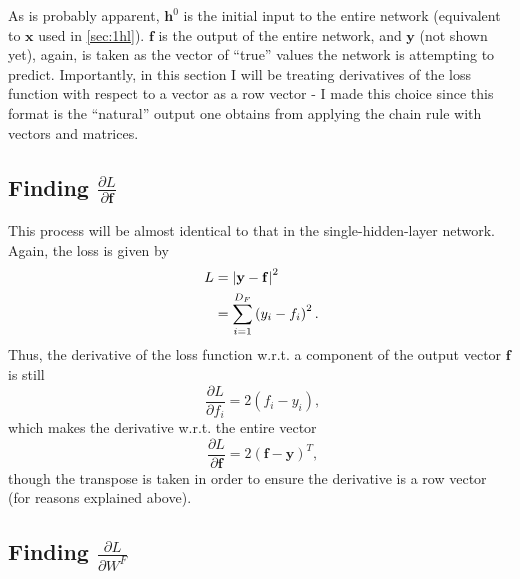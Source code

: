 \documentclass{article}
\newcommand{\pd}[0]{\phantom{.}}
\begin{document}
\vspace{1em}
As is probably apparent, $\mathbf{h}^0$ is the initial input to the entire network (equivalent to $\mathbf{x}$ used in \cref{sec:1hl}). $\mathbf{f}$ is the output of the entire network, and $\mathbf{y}$ (not shown yet), again, is taken as the vector of ``true'' values the network is attempting to predict. Importantly, in this section I will be treating derivatives of the loss function with respect to a vector as a row vector - I made this choice since this format is the ``natural'' output one obtains from applying the chain rule with vectors and matrices.

\subsection{Finding \texorpdfstring{$\frac{\partial L}{\partial \mathbf{f}}$}{dL/df}}
\label{sec:dL/df}

This process will be almost identical to that in the single-hidden-layer network. Again, the loss is given by
\begin{align}
    \pd L &= \left|\mathbf{y} - \mathbf{f}\right|^2\notag \\
    &= \displaystyle\sum_{i=1}^{D_F}\left(y_i - f_i\right)^2.
\end{align}
Thus, the derivative of the loss function w.r.t. a component of the output vector $\mathbf{f}$ is still
\begin{equation}
    \phantom{,}\frac{\partial L}{\partial f_i} = 2(f_i - y_i),
\end{equation}
which makes the derivative w.r.t. the entire vector
\begin{equation}
\label{eq:dL/df}
    \phantom{,}\frac{\partial L}{\partial \mathbf{f}} = 2(\mathbf{f} - \mathbf{y})^T,
\end{equation}
though the transpose is taken in order to ensure the derivative is a row vector (for reasons explained above).

\subsection{Finding \texorpdfstring{$\frac{\partial L}{\partial W^F}$}{dL/dWF}}
\label{sec:dL/dWF}
\end{document}
